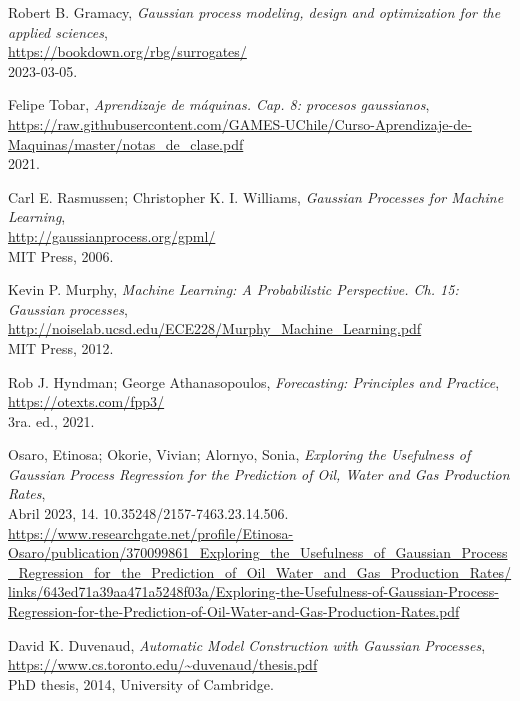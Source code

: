 \documentclass[a4paper]{article}
\begin{document}
\begin{thebibliography}{9}
	
	Robert B. Gramacy, \textit{Gaussian process modeling, design and optimization for the applied sciences},\\
	\url{https://bookdown.org/rbg/surrogates/}\\
	2023-03-05.
	
	Felipe Tobar, \textit{Aprendizaje de máquinas. Cap. 8: procesos gaussianos},\\
	\url{https://raw.githubusercontent.com/GAMES-UChile/Curso-Aprendizaje-de-Maquinas/master/notas_de_clase.pdf}\\
	2021.
	
	Carl E. Rasmussen; Christopher K. I. Williams, \textit{Gaussian Processes for Machine Learning},\\
	\url{http://gaussianprocess.org/gpml/}\\
	MIT Press, 2006.
	
	Kevin P. Murphy, \textit{Machine Learning: A Probabilistic Perspective. Ch. 15: Gaussian processes},\\
	\url{http://noiselab.ucsd.edu/ECE228/Murphy_Machine_Learning.pdf}\\
	MIT Press, 2012.
	
	Rob J. Hyndman; George Athanasopoulos, \textit{Forecasting: Principles and Practice},\\
	\url{https://otexts.com/fpp3/}\\
	3ra. ed., 2021.
	
	Osaro, Etinosa; Okorie, Vivian; Alornyo, Sonia, \textit{Exploring the Usefulness of Gaussian Process Regression for the Prediction of Oil, Water and Gas Production Rates},\\
	Abril 2023, 14. 10.35248/2157-7463.23.14.506.\\
	\url{https://www.researchgate.net/profile/Etinosa-Osaro/publication/370099861_Exploring_the_Usefulness_of_Gaussian_Process_Regression_for_the_Prediction_of_Oil_Water_and_Gas_Production_Rates/links/643ed71a39aa471a5248f03a/Exploring-the-Usefulness-of-Gaussian-Process-Regression-for-the-Prediction-of-Oil-Water-and-Gas-Production-Rates.pdf}
	
	David K. Duvenaud, \textit{Automatic Model Construction with Gaussian Processes},\\
	\url{https://www.cs.toronto.edu/~duvenaud/thesis.pdf}\\
	PhD thesis, 2014, University of Cambridge.
	
\end{thebibliography}
\end{document}
